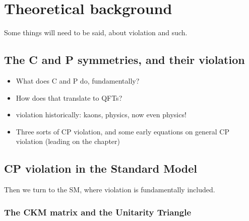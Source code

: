 

\chapter{Theoretical background}
\label{ch:2-litreview}

\minitoc

Some things will need to be said, about \CP violation and such.

\section{The C and P symmetries, and their violation} %
\label{sec:the_c_and_p_symmetries_and_their_violation}

\begin{itemize}
    \item What does C and P do, fundamentally?
    \item How does that translate to QFTs?
    \item \CP violation historically: kaons, \B physics, now even \D physics!
    \item Three sorts of CP violation, and some early equations on general CP violation (leading on the \KS chapter)
\end{itemize}


\section{CP violation in the Standard Model} %
\label{sec:cp_violation_in_the_standard_model}

Then we turn to the SM, where \CP violation is fundamentally included.

\subsection{The CKM matrix and the Unitarity Triangle} %
\label{sub:the_ckm_matrix}

